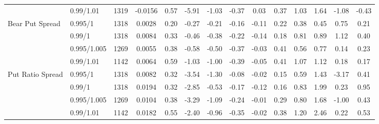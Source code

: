 \begin{tabular}{llcccccccccccc}
 & 0.99/1.01 & 1319 & -0.0156 & 0.57 & -5.91 & -1.03 & -0.37 & 0.03 & 0.37 & 1.03 & 1.64 & -1.08 & -0.43 \\
Bear Put Spread & 0.995/1 & 1318 & 0.0028 & 0.20 & -0.27 & -0.21 & -0.16 & -0.11 & 0.22 & 0.38 & 0.45 & 0.75 & 0.21 \\
 & 0.99/1 & 1318 & 0.0084 & 0.33 & -0.46 & -0.38 & -0.22 & -0.14 & 0.18 & 0.81 & 0.89 & 1.12 & 0.40 \\
 & 0.995/1.005 & 1269 & 0.0055 & 0.38 & -0.58 & -0.50 & -0.37 & -0.03 & 0.41 & 0.56 & 0.77 & 0.14 & 0.23 \\
 & 0.99/1.01 & 1142 & 0.0064 & 0.59 & -1.03 & -1.00 & -0.39 & -0.05 & 0.41 & 1.07 & 1.12 & 0.18 & 0.17 \\
Put Ratio Spread & 0.995/1 & 1318 & 0.0082 & 0.32 & -3.54 & -1.30 & -0.08 & -0.02 & 0.15 & 0.59 & 1.43 & -3.17 & 0.41 \\
 & 0.99/1 & 1318 & 0.0194 & 0.32 & -2.85 & -0.53 & -0.17 & -0.12 & 0.16 & 0.83 & 1.99 & 0.23 & 0.95 \\
 & 0.995/1.005 & 1269 & 0.0104 & 0.38 & -3.29 & -1.09 & -0.24 & -0.01 & 0.29 & 0.80 & 1.68 & -1.00 & 0.43 \\
 & 0.99/1.01 & 1142 & 0.0182 & 0.55 & -2.40 & -0.96 & -0.35 & -0.02 & 0.38 & 1.20 & 2.46 & 0.22 & 0.53 \\
\bottomrule
\end{tabular}
